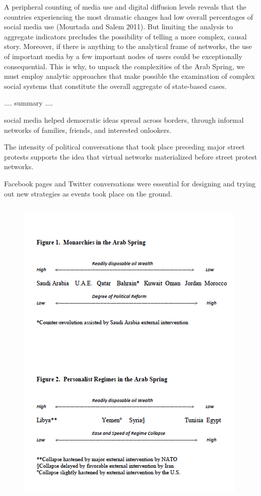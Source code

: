 A peripheral
counting of media use and digital diffusion levels reveals that the countries
experiencing the most dramatic changes had low overall percentages of social
media use (Mourtada and Salem 2011). But limiting the analysis to aggregate
indicators precludes the possibility of telling a more complex, causal story. Moreover,
if there is anything to the analytical frame of networks, the use of important
media by a few important nodes of users could be exceptionally
consequential. This is why, to unpack the complexities of the Arab Spring, we
must employ analytic approaches that make possible the examination of complex
social systems that constitute the overall aggregate of state-based cases.


.... summary ....

social media helped democratic ideas spread across borders, through informal networks of families, friends, and interested onlookers.

The intensity of political conversations that took place preceding major street protests supports the idea that virtual networks materialized before street protest networks.

Facebook pages and Twitter conversations were essential for designing and trying out new strategies as events took place on the ground.




\subsection{\cite{goldstone_bringing_2013}}

    \begin{figure}[h]
        \centering
        \includegraphics[width=.8\textwidth]{goldstone_2013_ssrn.png}
        \caption{\cite{goldstone_bringing_2013}}
        \label{fig:init_res}
    \end{figure}  

